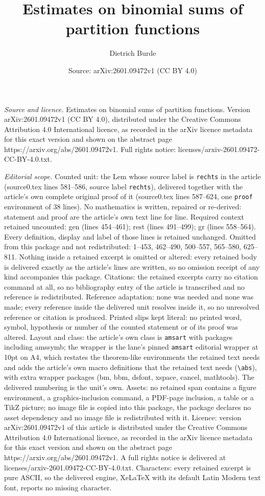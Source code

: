\documentclass[10pt,a4paper]{amsart}
\title[Estimates on binomial sums of partition functions]{Estimates on binomial sums of partition functions}
\author{Dietrich Burde}
\date{Source: arXiv:2601.09472v1 (CC BY 4.0)}
\begin{document}
\maketitle

\noindent\emph{Source and licence.} Estimates on binomial sums of partition functions. Version arXiv:2601.09472v1 (CC BY 4.0), distributed under the Creative Commons Attribution 4.0 International licence, as recorded in the arXiv licence metadata for this exact version and shown on the abstract page https://arxiv.org/abs/2601.09472v1. Full rights notice: licenses/arxiv-2601.09472-CC-BY-4.0.txt.\par\smallskip

\noindent\textit{Editorial scope.} Counted unit: the Lem whose source label is \texttt{rechts} in the article (source0.tex lines 581--586, source label \texttt{rechts}), delivered together with the article's own complete original proof of it (source0.tex lines 587--624, one \texttt{proof} environment of 38 lines). No mathematics is written, repaired or re-derived: statement and proof are the article's own text line for line. Required context retained uncounted: gen (lines 454--461); rest (lines 491--499); gr (lines 558--564). Every definition, display and label of those lines is retained unchanged. Omitted from this package and not redistributed: 1--453, 462--490, 500--557, 565--580, 625--811. Nothing inside a retained excerpt is omitted or altered: every retained body is delivered exactly as the article's lines are written, so no omission receipt of any kind accompanies this package. Citations: the retained excerpts carry no citation command at all, so no bibliography entry of the article is transcribed and no reference is redistributed. Reference adaptation: none was needed and none was made; every reference inside the delivered unit resolves inside it, so no unresolved reference or citation is produced. Printed slips kept literal: no printed word, symbol, hypothesis or number of the counted statement or of its proof was altered. Layout and class: the article's own class is \texttt{amsart} with packages including amssymb; the wrapper is the lane's pinned \texttt{amsart} editorial wrapper at 10pt on A4, which restates the theorem-like environments the retained text needs and adds the article's own macro definitions that the retained text needs (\texttt{\textbackslash abs}), with extra wrapper packages (bm, bbm, dsfont, xspace, cancel, mathtools). The delivered numbering is the unit's own. Assets: no retained span contains a figure environment, a graphics-inclusion command, a PDF-page inclusion, a table or a TikZ picture; no image file is copied into this package, the package declares no asset dependency and no image file is redistributed with it. Licence: version arXiv:2601.09472v1 of this article is distributed under the Creative Commons Attribution 4.0 International licence, as recorded in the arXiv licence metadata for this exact version and shown on the abstract page https://arxiv.org/abs/2601.09472v1. A full rights notice is delivered at licenses/arxiv-2601.09472-CC-BY-4.0.txt. Characters: every retained excerpt is pure ASCII, so the delivered engine, XeLaTeX with its default Latin Modern text font, reports no missing character.
\end{document}
